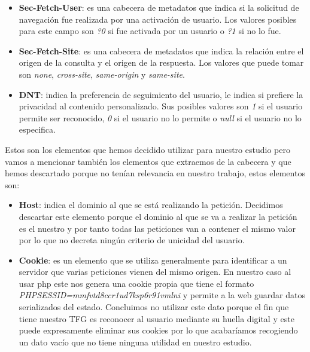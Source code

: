 \begin{itemize}
    \item \textbf{Sec-Fetch-User}: es una cabecera de metadatos que indica si la solicitud de navegación fue realizada por una activación de usuario. Los valores posibles para este campo son \textit{?0} si fue activada por un usuario o \textit{?1} si no lo fue.
    \item \textbf{Sec-Fetch-Site}: es una cabecera de metadatos que indica la relación entre el origen de la consulta y el origen de la respuesta. Los valores que puede tomar son \textit{none}, \textit{cross-site}, \textit{same-origin} y \textit{same-site}.
    \item \textbf{DNT}: indica la preferencia de seguimiento del usuario, le indica si prefiere la privacidad al contenido personalizado. Sus posibles valores son \textit{1} si el usuario permite ser reconocido, \textit{0} si el usuario no lo permite o \textit{null} si el usuario no lo especifica.
\end{itemize}
Estos son los elementos que hemos decidido utilizar para nuestro estudio pero vamos a mencionar también los elementos que extraemos de la cabecera y que hemos descartado porque no tenían relevancia en nuestro trabajo, estos elementos son:
\begin{itemize}
    \item \textbf{Host}: indica el dominio al que se está realizando la petición. Decidimos descartar este elemento porque el dominio al que se va a realizar la petición es el nuestro y por tanto todas las peticiones van a contener el mismo valor por lo que no decreta ningún criterio de unicidad del usuario.
    \item \textbf{Cookie}: es un elemento que se utiliza generalmente para identificar a un servidor que varias peticiones vienen del mismo origen. En nuestro caso al usar php este nos genera una cookie propia que tiene el formato \textit{PHPSESSID=mmfvtd8ccr1ud7ksp6r91vmlni} y permite a la web guardar datos serializados del estado. Concluimos no utilizar este dato porque el fin que tiene nuestro TFG es reconocer al usuario mediante su huella digital y este puede expresamente eliminar sus cookies por lo que acabaríamos recogiendo un dato vacío que no tiene ninguna utilidad en nuestro estudio.
\end{itemize}

